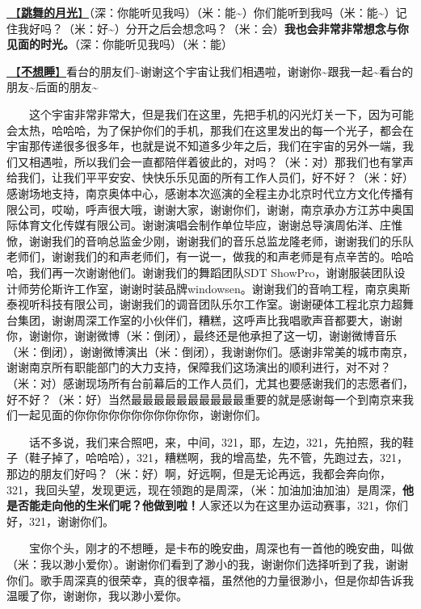 \documentclass[]{ctexbook}
\begin{document}
\hyperref[dancing-moonshine]{🎵【\textbf{跳舞的月光}】}（深：你能听见我吗）（米：能\textasciitilde）你们能听到我吗（米：能\textasciitilde）记住我好吗？（米：好\textasciitilde）分开之后会想念吗？（米：会）\textbf{我也会非常非常想念与你见面的时光。}（深：你能听见我吗）（米：能）

\hyperref[keep-playing]{🎵【\textbf{不想睡}】}看台的朋友们\textasciitilde 谢谢这个宇宙让我们相遇啦，谢谢你\textasciitilde 跟我一起\textasciitilde 看台的朋友\textasciitilde 后面的朋友\textasciitilde{}

  这个宇宙非常非常大，但是我们在这里，先把手机的闪光灯关一下，因为可能会太热，哈哈哈，为了保护你们的手机，那我们在这里发出的每一个光子，都会在宇宙那传递很多很多年，也就是说不知道多少年之后，我们在宇宙的另外一端，我们又相遇啦，所以我们会一直都陪伴着彼此的，对吗？（米：对）那我们也有掌声给我们，让我们平平安安、快快乐乐见面的所有工作人员们，好不好？（米：好）感谢场地支持，南京奥体中心，感谢本次巡演的全程主办北京时代立方文化传播有限公司，哎呦，呼声很大哦，谢谢大家，谢谢你们，谢谢，南京承办方江苏中奥国际体育文化传媒有限公司。谢谢演唱会制作单位毕应，谢谢总导演周佑洋、庄惟惞，谢谢我们的音响总监金少刚，谢谢我们的音乐总监龙隆老师，谢谢我们的乐队老师们，谢谢我们的和声老师们，有一说一，做我的和声老师是有点辛苦的。哈哈哈，我们再一次谢谢他们。谢谢我们的舞蹈团队SDT ShowPro，谢谢服装团队设计师劳伦斯许工作室，谢谢时装品牌windowsen。谢谢我们的音响工程，南京奥斯泰视听科技有限公司，谢谢我们的调音团队乐尔工作室。谢谢硬体工程北京力超舞台集团，谢谢周深工作室的小伙伴们，糟糕，这呼声比我唱歌声音都要大，谢谢你，谢谢你，谢谢微博（米：倒闭），最终还是他承担了这一切，谢谢微博音乐（米：倒闭），谢谢微博演出（米：倒闭），我谢谢你们。感谢非常美的城市南京，谢谢南京所有职能部门的大力支持，保障我们这场演出的顺利进行，对不对？（米：对）感谢现场所有台前幕后的工作人员们，尤其也要感谢我们的志愿者们，好不好？（米：好）当然最最最最最最最最最最重要的就是感谢每一个到南京来我们一起见面的你你你你你你你你你你你，谢谢你们。

  话不多说，我们来合照吧，来，中间，321，耶，左边，321，先拍照，我的鞋子（鞋子掉了，哈哈哈），321，糟糕啊，我的增高垫，先不管，先跑过去，321，那边的朋友们好吗？（米：好）啊，好远啊，但是无论再远，我都会奔向你，321，我回头望，发现更远，现在领跑的是周深，（米：加油加油加油）是周深，\textbf{他是否能走向他的生米们呢？他做到啦！}人家还以为在这里办运动赛事，321，你们好，321，谢谢你们。

  宝你个头，刚才的不想睡，是卡布的晚安曲，周深也有一首他的晚安曲，叫做（米：我以渺小爱你）。谢谢你们看到了渺小的我，谢谢你们选择听到了我，谢谢你们。歌手周深真的很荣幸，真的很幸福，虽然他的力量很渺小，但是你却告诉我温暖了你，谢谢你，我以渺小爱你。
\end{document}
